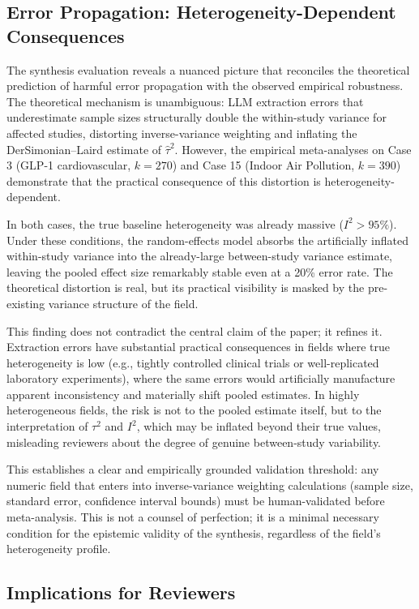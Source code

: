 \documentclass[12pt]{article}
\begin{document}
\subsection{Error Propagation: Heterogeneity-Dependent Consequences}

The synthesis evaluation reveals a nuanced picture that reconciles the theoretical prediction of harmful error propagation with the observed empirical robustness. The theoretical mechanism is unambiguous: LLM extraction errors that underestimate sample sizes structurally double the within-study variance for affected studies, distorting inverse-variance weighting and inflating the DerSimonian--Laird estimate of $\hat{\tau}^2$. However, the empirical meta-analyses on Case 3 (GLP-1 cardiovascular, $k=270$) and Case 15 (Indoor Air Pollution, $k=390$) demonstrate that the practical consequence of this distortion is heterogeneity-dependent.

In both cases, the true baseline heterogeneity was already massive ($I^2 > 95\%$). Under these conditions, the random-effects model absorbs the artificially inflated within-study variance into the already-large between-study variance estimate, leaving the pooled effect size remarkably stable even at a 20\% error rate. The theoretical distortion is real, but its practical visibility is masked by the pre-existing variance structure of the field.

This finding does not contradict the central claim of the paper; it refines it. Extraction errors have substantial practical consequences in fields where true heterogeneity is low (e.g., tightly controlled clinical trials or well-replicated laboratory experiments), where the same errors would artificially manufacture apparent inconsistency and materially shift pooled estimates. In highly heterogeneous fields, the risk is not to the pooled estimate itself, but to the interpretation of $\tau^2$ and $I^2$, which may be inflated beyond their true values, misleading reviewers about the degree of genuine between-study variability.

This establishes a clear and empirically grounded validation threshold: any numeric field that enters into inverse-variance weighting calculations (sample size, standard error, confidence interval bounds) must be human-validated before meta-analysis. This is not a counsel of perfection; it is a minimal necessary condition for the epistemic validity of the synthesis, regardless of the field's heterogeneity profile.

\subsection{Implications for Reviewers}
\end{document}
